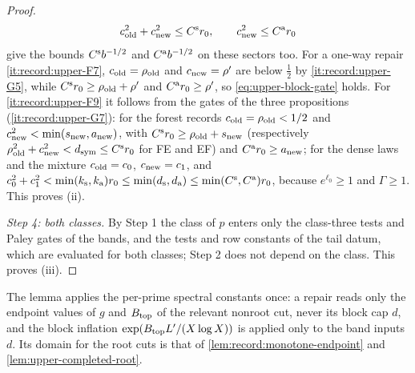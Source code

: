 \begin{proof}
\begin{equation}
 c_{\rm old}^2+c_{\rm new}^2\le C^{\rm s}r_0,\qquad c_{\rm new}^2\le C^{\rm a}r_0
\end{equation}
give the bounds $C^{\rm s}b^{-1/2}$ and $C^{\rm a}b^{-1/2}$ on these sectors too. For
a one-way repair \ref{it:record:upper-F7}, $c_{\rm old}=\rho_{\rm old}$ and
$c_{\rm new}=\rho'$ are below $\frac12$ by \ref{it:record:upper-G5}, while
$C^{\rm s}r_0\ge\rho_{\rm old}+\rho'$ and $C^{\rm a}r_0\ge\rho'$, so
\eqref{eq:upper-block-gate} holds. For \ref{it:record:upper-F9} it follows from the
gates of the three propositions (\ref{it:record:upper-G7}): for the forest records
$c_{\rm old}=\rho_{\rm old}<\frac12$ and $c_{\rm new}^2<\min(s_{\rm new},a_{\rm new})$,
with $C^{\rm s}r_0\ge\rho_{\rm old}+s_{\rm new}$ (respectively
$\rho_{\rm old}^2+c_{\rm new}^2<d_{\rm sym}\le C^{\rm s}r_0$ for FE and EF) and
$C^{\rm a}r_0\ge a_{\rm new}$; for the dense laws and the mixture
$c_{\rm old}=c_0$, $c_{\rm new}=c_1$, and $c_0^2+c_1^2<\min(k_{\rm s},k_{\rm a})r_0\le
\min(d_{\rm s},d_{\rm a})\le\min(C^{\rm s},C^{\rm a})r_0$, because $e^{\ell_0}\ge1$ and
$\Gamma\ge1$. This proves (ii).

\emph{Step 4: both classes.} By Step 1 the class of $p$ enters only the class-three
tests and Paley gates of the bands, and the tests and row constants of the tail
datum, which are evaluated for both classes; Step 2 does not depend on the class.
This proves (iii).
\end{proof}

The lemma applies the per-prime spectral constants once: a repair reads only
the endpoint values of $g$ and $B_{\rm top}$ of the relevant nonroot cut,
never its block cap $d$, and the block inflation $\exp(B_{\rm top}L'/(X\log
X))$ is applied only to the band inputs $d$. Its domain for the root cuts is
that of \cref{lem:record:monotone-endpoint} and \cref{lem:upper-completed-root}.

